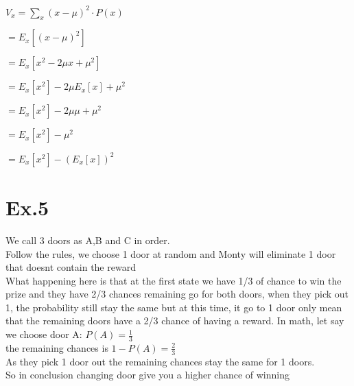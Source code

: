 \documentclass[10pt]{article}
\begin{document}
$V_{x}=\sum_{x}(x-\mu)^{2} \cdot P(x)$

$=E_{x}\left[(x-\mu)^{2}\right]$

$=E_{x}\left[x^{2}-2 \mu x+\mu^{2}\right]$

$=E_{x}\left[x^{2}\right]-2 \mu E_{x}[x]+\mu^{2}$

$=E_{x}\left[x^{2}\right]-2 \mu \mu+\mu^{2}$

$=E_{x}\left[x^{2}\right]-\mu^{2}$

$=E_{x}\left[x^{2}\right]-\left(E_{x}[x]\right)^{2}$

\section{Ex.5}
We call 3 doors as A,B and C in order.\\
Follow the rules, we choose 1 door at random and Monty will eliminate 1 door that doesnt contain the reward\\
What happening here is that at the first state we have 1/3 of chance to win the prize and they have 2/3 chances remaining go for both doors, when they pick out 1, the probability still stay the same but at this time, it go to 1 door only mean that the remaining doors have a 2/3 chance of having a reward. In math, let say we choose door A: $P(A) = \frac{1}{3}$\\
the remaining chances is $1 - P(A) = \frac{2}{3}$\\
As they pick 1 door out the remaining chances stay the same for 1 doors.\\
So in conclusion changing door give you a higher chance of winning
\end{document}
